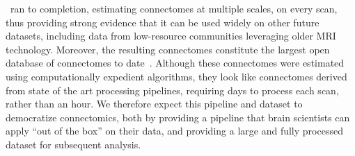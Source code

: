 \documentclass[11pt]{article}
\begin{document}
\begin{multicols}{2}
\ndmg~ran to completion, estimating connectomes at multiple scales, on every scan, thus providing strong evidence that it can be used widely on other future datasets, including data from low-resource communities leveraging older MRI technology.  Moreover, the resulting connectomes constitute  the largest open database of connectomes to date~\cite{brown2016connected}.  Although these connectomes were estimated using computationally expedient algorithms, they look like connectomes derived from state of the art processing pipelines, requiring days to process each scan, rather than an hour. We therefore expect this pipeline and dataset to democratize connectomics, both by providing a pipeline that brain scientists can apply ``out of the box'' on their data, and providing a large and fully processed dataset for subsequent analysis. 





\end{multicols}
\end{document}
